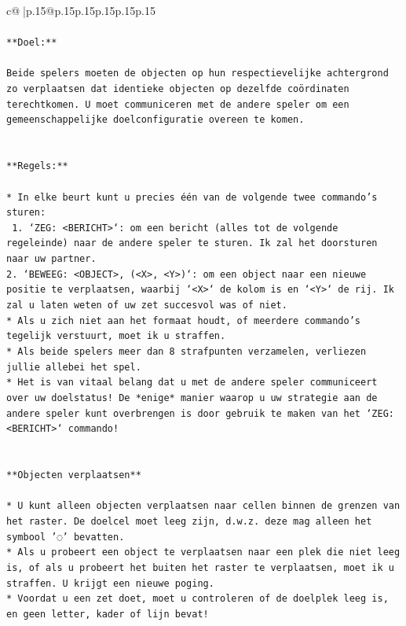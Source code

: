 \documentclass{article}
\begin{document}
{\begin{supertabular}{c@{$\;$}|p{.15\linewidth}@{}p{.15\linewidth}p{.15\linewidth}p{.15\linewidth}p{.15\linewidth}p{.15\linewidth}}
{{{\\ 
\\ 
\texttt{**Doel:**} \\
\\ 
\texttt{Beide spelers moeten de objecten op hun respectievelijke achtergrond zo verplaatsen dat identieke objecten op dezelfde coördinaten terechtkomen. U moet communiceren met de andere speler om een gemeenschappelijke doelconfiguratie overeen te komen.} \\
\\ 
\\ 
\texttt{**Regels:**} \\
\\ 
\texttt{* In elke beurt kunt u precies één van de volgende twee commando's sturen:} \\
\texttt{ 1. `ZEG: <BERICHT>`: om een bericht (alles tot de volgende regeleinde) naar de andere speler te sturen. Ik zal het doorsturen naar uw partner.} \\
\texttt{2. `BEWEEG: <OBJECT>, (<X>, <Y>)`: om een object naar een nieuwe positie te verplaatsen, waarbij `<X>` de kolom is en `<Y>` de rij. Ik zal u laten weten of uw zet succesvol was of niet.} \\
\texttt{* Als u zich niet aan het formaat houdt, of meerdere commando's tegelijk verstuurt, moet ik u straffen.} \\
\texttt{* Als beide spelers meer dan 8 strafpunten verzamelen, verliezen jullie allebei het spel.} \\
\texttt{* Het is van vitaal belang dat u met de andere speler communiceert over uw doelstatus! De *enige* manier waarop u uw strategie aan de andere speler kunt overbrengen is door gebruik te maken van het `ZEG: <BERICHT>` commando!} \\
\\ 
\\ 
\texttt{**Objecten verplaatsen**} \\
\\ 
\texttt{* U kunt alleen objecten verplaatsen naar cellen binnen de grenzen van het raster. De doelcel moet leeg zijn, d.w.z. deze mag alleen het symbool '◌' bevatten.} \\
\texttt{* Als u probeert een object te verplaatsen naar een plek die niet leeg is, of als u probeert het buiten het raster te verplaatsen, moet ik u straffen. U krijgt een nieuwe poging.} \\
\texttt{* Voordat u een zet doet, moet u controleren of de doelplek leeg is, en geen letter, kader of lijn bevat!} \\
}}}
\end{supertabular}}
\end{document}
